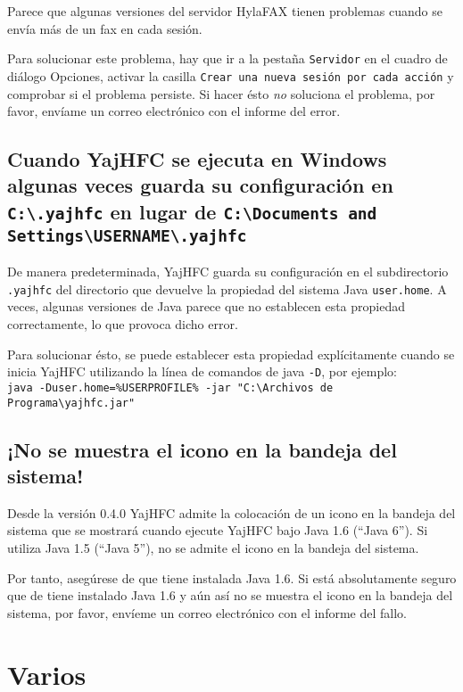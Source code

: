 \documentclass[a4paper,10pt]{scrartcl}
\begin{document}
Parece que algunas versiones del servidor HylaFAX tienen problemas cuando se envía más de un fax en cada sesión.

Para solucionar este problema, hay que ir a la pestaña \texttt{Servidor} en el cuadro de diálogo Opciones, activar la casilla \texttt{Crear una nueva sesión por cada acción} y comprobar si el problema persiste.
Si hacer ésto \emph{no} soluciona el problema, por favor, envíame un correo electrónico con el informe del error.

\subsection{Cuando YajHFC se ejecuta en Windows algunas veces guarda su configuración en \texttt{C:\textbackslash .yajhfc} en lugar de \texttt{C:\textbackslash Documents and Settings\textbackslash USERNAME\textbackslash .yajhfc}}

De manera predeterminada, YajHFC guarda su configuración en el subdirectorio \texttt{.yajhfc} del directorio que devuelve
la propiedad del sistema Java \texttt{user.home}.
A veces, algunas versiones de Java parece que no establecen esta propiedad correctamente, lo que provoca dicho error.

Para solucionar ésto, se puede establecer esta propiedad explícitamente cuando se inicia YajHFC utilizando la línea de comandos de java \texttt{-D}, por ejemplo:\\
\texttt{java -Duser.home=\%USERPROFILE\% -jar "C:\textbackslash Archivos de Programa\textbackslash yajhfc.jar"}

\subsection{¡No se muestra el icono en la bandeja del sistema!}

Desde la versión 0.4.0 YajHFC admite la colocación de un icono en la bandeja del sistema que se mostrará cuando ejecute YajHFC bajo Java 1.6 (``Java 6'').
Si utiliza Java 1.5 (``Java 5''), no se admite el icono en la bandeja del sistema.

Por tanto, asegúrese de que tiene instalada Java 1.6. Si está absolutamente seguro que de tiene instalado Java 1.6 y aún así no se muestra el icono en la bandeja del sistema, por favor, envíeme un correo electrónico con el informe del fallo.


\section{Varios}
\end{document}

